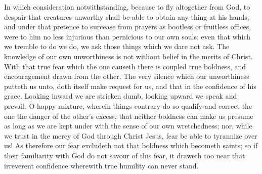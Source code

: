 In which consideration notwithstanding, because to fly altogether from God, to despair that creatures unworthy shall be able to obtain any thing at his hands, and under that pretence to surcease from prayers as bootless or fruitless offices, were to him no less injurious than pernicious to our own souls; even that which we tremble to do we do, we ask those things which we dare not ask. The knowledge of our own unworthiness is not without belief in the merits of Christ. With that true fear which the one causeth there is coupled true boldness, and encouragement drawn from the other. The very silence which our unworthiness putteth us unto, doth itself make request for us, and that in the confidence of his grace. Looking inward we are stricken dumb, looking upward we speak and prevail. O happy mixture, wherein things contrary do so qualify and correct the one the danger of the other’s excess, that neither boldness can make us presume as long as we are kept under with the sense of our own wretchedness; nor, while we trust in the mercy of God through Christ Jesus, fear be able to tyrannize over us! As therefore our fear excludeth not that boldness which becometh saints; so if their familiarity with God do not savour of this fear, it draweth too near that irreverent confidence wherewith true humility can never stand.

